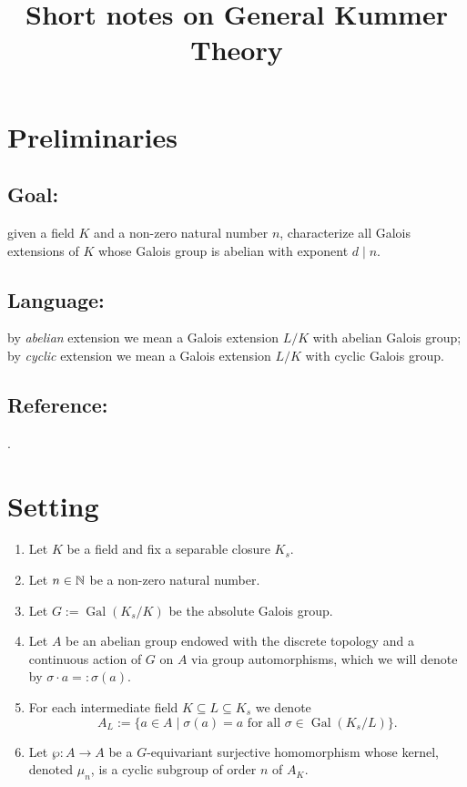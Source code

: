 \documentclass[12pt]{amsart}
\DeclareMathOperator{\Gal}{Gal}
\begin{document}
\title{Short notes on General Kummer Theory}
\maketitle

\section{Preliminaries}

\subsection*{Goal:} given a field $K$ and a non-zero natural number $n$, characterize all Galois extensions of $K$ whose Galois group is abelian with exponent $d\mid n$.

\subsection*{Language:} by \textit{abelian} extension we mean a Galois extension $L/K$ with abelian Galois group; by \textit{cyclic} extension we mean a Galois extension $L/K$ with cyclic Galois group.

\subsection*{Reference:} \cite[\S 4.10]{bos18}.

\section{Setting}

\begin{enumerate}
    \item Let $K$ be a field and fix a separable closure $K_{s}$.
    \item Let $n\in \mathbb{N}$ be a non-zero natural number.
    \item Let $G:=\Gal(K_{s}/K)$ be the absolute Galois group.
    \item Let $A$ be an abelian group endowed with the discrete topology and a continuous action of $G$ on $A$ via group automorphisms, which we will denote by $\sigma \cdot a=:\sigma(a)$.
    \item For each intermediate field $K\subseteq L\subseteq K_{s}$ we denote
	\[ A_{L}:=\{ a\in A\mid \sigma(a)=a \text{ for all }\sigma\in \Gal(K_{s}/L)\}. \]
    \item Let $\wp\colon A\to A$ be a $G$-equivariant surjective homomorphism whose kernel, denoted $\mu_{n}$, is a cyclic subgroup of order $n$ of $A_{K}$.
\end{enumerate}
\end{document}
